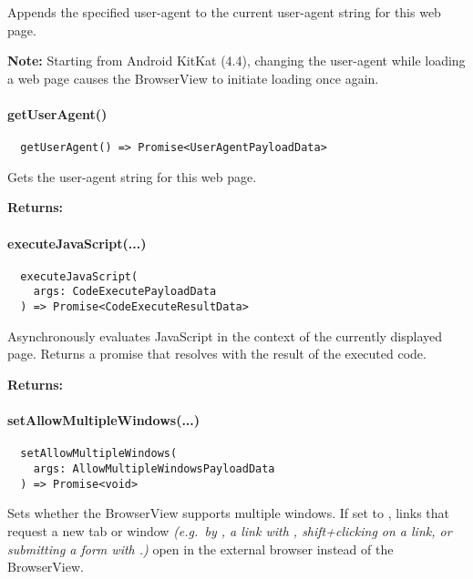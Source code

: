 Appends the specified user-agent to the current user-agent string for this web page.

\textbf{Note:} Starting from Android KitKat (4.4), changing the user-agent while
loading a web page causes the BrowserView to initiate loading once again.~\cite{android:api}


\paragraph{getUserAgent()}

\begin{verbatim}
  getUserAgent() => Promise<UserAgentPayloadData>
\end{verbatim}

Gets the user-agent string for this web page.

\textbf{Returns:} 


\newpage

\paragraph{executeJavaScript(...)}

\begin{verbatim}
  executeJavaScript(
    args: CodeExecutePayloadData
  ) => Promise<CodeExecuteResultData>
\end{verbatim}

Asynchronously evaluates JavaScript in the context of the currently displayed page.
Returns a promise that resolves with the result of the executed code.

\textbf{Returns:} 


\paragraph{setAllowMultipleWindows(...)}

\begin{verbatim}
  setAllowMultipleWindows(
    args: AllowMultipleWindowsPayloadData
  ) => Promise<void>
\end{verbatim}

Sets whether the BrowserView supports multiple windows.
If set to , links that request a new tab or window \textit{(e.g.\ by , a link with ,
shift+clicking on a link, or submitting a form with .)} open in the external browser
instead of the BrowserView.

